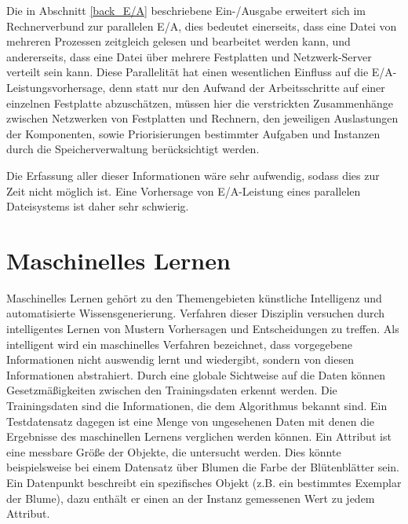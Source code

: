 \documentclass[
	12pt,
	a4paper,
	BCOR10mm,
	DIV14,
	listof=totoc,
	bibliography=totoc,
	headsepline
]{scrreprt}
\begin{document}
Die in Abschnitt \ref{back_E/A} beschriebene Ein-/Ausgabe erweitert sich im Rechnerverbund zur parallelen E/A, dies bedeutet einerseits, dass eine Datei von mehreren Prozessen zeitgleich gelesen und bearbeitet werden kann, und andererseits, dass eine Datei über mehrere Festplatten und Netzwerk-Server verteilt sein kann. Diese Parallelität hat einen wesentlichen Einfluss auf die E/A-Leistungsvorhersage, denn statt nur den Aufwand der Arbeitsschritte auf einer einzelnen Festplatte abzuschätzen, müssen hier die verstrickten Zusammenhänge zwischen Netzwerken von Festplatten und Rechnern, den jeweiligen Auslastungen der Komponenten, sowie Priorisierungen bestimmter Aufgaben und Instanzen durch die Speicherverwaltung berücksichtigt werden.

Die Erfassung aller dieser Informationen wäre sehr aufwendig, sodass dies zur Zeit nicht möglich ist. Eine Vorhersage von E/A-Leistung eines parallelen Dateisystems ist daher sehr schwierig.

\section{Maschinelles Lernen}
\label{back_ML}
Maschinelles Lernen gehört zu den Themengebieten künstliche Intelligenz und automatisierte Wissensgenerierung. Verfahren dieser Disziplin versuchen durch intelligentes Lernen von Mustern Vorhersagen und Entscheidungen zu treffen.
Als intelligent wird ein maschinelles Verfahren bezeichnet, dass vorgegebene Informationen nicht auswendig lernt und wiedergibt, sondern von diesen Informationen abstrahiert.
Durch eine globale Sichtweise auf die Daten können Gesetzmäßigkeiten zwischen den Trainingsdaten erkennt werden.
Die Trainingsdaten sind die Informationen, die dem Algorithmus bekannt sind.
Ein Testdatensatz dagegen ist eine Menge von ungesehenen Daten mit denen die Ergebnisse des maschinellen Lernens verglichen werden können.
Ein Attribut ist eine messbare Größe der Objekte, die untersucht werden. Dies könnte beispielsweise bei einem Datensatz über Blumen die Farbe der Blütenblätter sein.
Ein Datenpunkt beschreibt ein spezifisches Objekt (z.B. ein bestimmtes Exemplar der Blume), dazu enthält er einen an der Instanz gemessenen Wert zu jedem Attribut.
\end{document}
